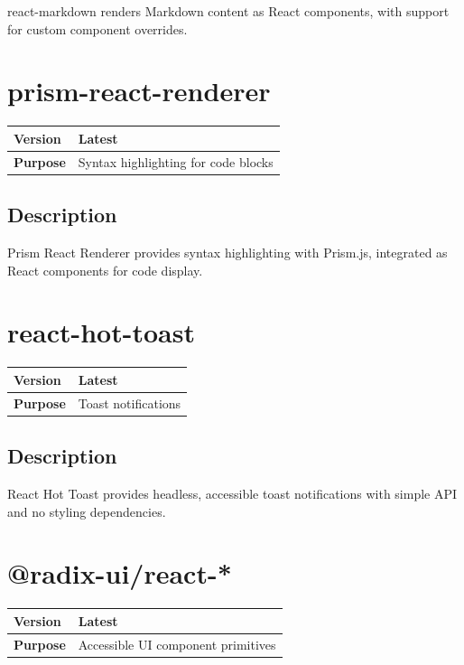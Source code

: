 \documentclass[12pt,a4paper]{report}
\begin{document}
react-markdown renders Markdown content as React components, with support for custom component overrides.

\section{prism-react-renderer}

\begin{tabular}{|p{4cm}|p{10cm}|}
\hline
\textbf{Version} & Latest \\
\hline
\textbf{Purpose} & Syntax highlighting for code blocks \\
\hline
\end{tabular}

\subsection{Description}

Prism React Renderer provides syntax highlighting with Prism.js, integrated as React components for code display.

\section{react-hot-toast}

\begin{tabular}{|p{4cm}|p{10cm}|}
\hline
\textbf{Version} & Latest \\
\hline
\textbf{Purpose} & Toast notifications \\
\hline
\end{tabular}

\subsection{Description}

React Hot Toast provides headless, accessible toast notifications with simple API and no styling dependencies.

\section{@radix-ui/react-*}

\begin{tabular}{|p{4cm}|p{10cm}|}
\hline
\textbf{Version} & Latest \\
\hline
\textbf{Purpose} & Accessible UI component primitives \\
\hline
\end{tabular}
\end{document}
